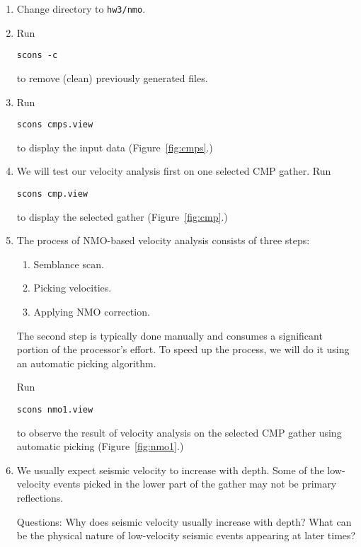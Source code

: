 \begin{enumerate}          
\item Change directory to \texttt{hw3/nmo}.
\item Run
\begin{verbatim}
scons -c
\end{verbatim}
to remove (clean) previously generated files.
\item Run
\begin{verbatim}
scons cmps.view 
\end{verbatim}
to display the input data (Figure~\ref{fig:cmps}.)


\item We will test our velocity analysis first on one selected CMP gather. Run
\begin{verbatim}
scons cmp.view
\end{verbatim}
to display the selected gather (Figure~\ref{fig:cmp}.)


\item The process of NMO-based velocity analysis consists of three steps:
\begin{enumerate}
\item Semblance scan.
\item Picking velocities.
\item Applying NMO correction.
\end{enumerate}
The second step is typically done manually and consumes a significant
portion of the processor's effort. To speed up the process, we will do
it using an automatic picking algorithm.

Run
\begin{verbatim}
scons nmo1.view
\end{verbatim}
to observe the result of velocity analysis on the selected CMP gather
using automatic picking (Figure~\ref{fig:nmo1}.)

\item We usually expect seismic velocity to increase with depth. Some of the
low-velocity events picked in the lower part of the gather may not be
primary reflections.

Questions: Why does seismic velocity usually increase with depth? What
can be the physical nature of low-velocity seismic events appearing at
later times?


\end{enumerate}
